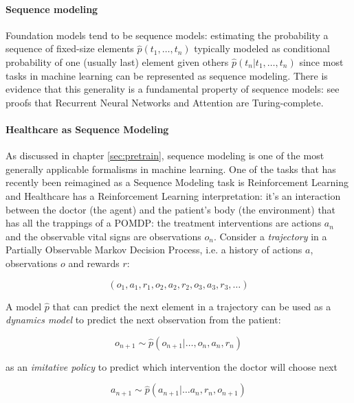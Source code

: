 \paragraph{Sequence modeling}

Foundation models tend to be sequence models: estimating the probability a sequence of fixed-size elements $\hat{p}(t_1, \dots, t_n)$ typically modeled as conditional probability of one (usually last) element given others $\hat{p}(t_n | t_1, \dots, t_n)$ since most tasks in machine learning can be represented as sequence modeling. 
There is evidence that this generality is a fundamental property of sequence models: see proofs that Recurrent Neural Networks \cite{siegelmannComputationTuringLimit1995} and Attention \cite{perezAttentionTuringComplete} are Turing-complete.

\paragraph{Healthcare as Sequence Modeling}
\label{sec:sequencemodel}

As discussed in chapter \ref{sec:pretrain}, sequence modeling is one of the most generally applicable formalisms in machine learning.
One of the tasks that has recently been reimagined as a Sequence Modeling task is Reinforcement Learning and Healthcare has a Reinforcement Learning interpretation: it's an interaction between the doctor (the agent) and the patient's body (the environment) that has all the trappings of a POMDP: the treatment interventions are actions $a_n$ and the observable vital signs are observations $o_n$.
Consider a \emph{trajectory} in a Partially Observable Markov Decision Process, i.e. a history of actions $a$, observations $o$ and rewards $r$:

\begin{equation}
    (o_1, a_1, r_1, o_2, a_2, r_2, o_3, a_3, r_3, \dots)
\end{equation}

A model $\hat{p}$ that can predict the next element in a trajectory can be used as a \emph{dynamics model} to predict the next observation from the patient:

\begin{equation}
    o_{n+1} \sim \hat{p}(o_{n+1} | \dots, o_n, a_n, r_n)
\end{equation}

as an \emph{imitative policy} to predict which intervention the doctor will choose next

\begin{equation}
    a_{n+1} \sim \hat{p}(a_{n+1} | \dots a_n, r_n, o_{n+1})
\end{equation}

